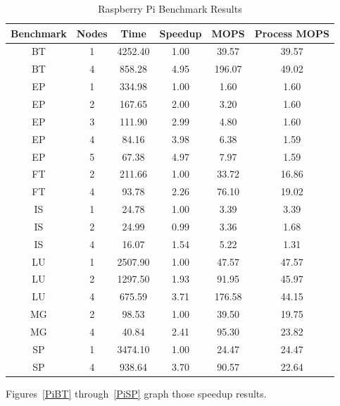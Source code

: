 \documentclass{acm_proc_article-sp}
\begin{document}
\begin{table}[tbp]
\centering
\caption{Raspberry Pi Benchmark Results}
\label{PiTable}
\begin{tabular}{ c | c || c | c | c | c }
	Benchmark & Nodes & Time & Speedup & MOPS & Process MOPS\\ \hline
    BT & 1 & 4252.40 & 1.00  & 39.57 & 39.57 \\
    BT & 4 & 858.28 & 4.95  & 196.07 & 49.02 \\
    EP & 1 & 334.98 & 1.00  & 1.60   & 1.60 \\
    EP & 2 & 167.65 & 2.00  & 3.20   & 1.60 \\
    EP & 3 & 111.90 & 2.99  & 4.80   & 1.60 \\
    EP & 4 & 84.16 & 3.98  & 6.38  & 1.59 \\
    EP & 5 & 67.38 & 4.97  & 7.97  & 1.59 \\
    FT & 2 & 211.66 & 1.00  & 33.72 & 16.86 \\
    FT & 4 & 93.78 & 2.26  & 76.10  & 19.02 \\
    IS & 1 & 24.78 & 1.00  & 3.39  & 3.39 \\
    IS & 2 & 24.99 & 0.99  & 3.36  & 1.68 \\
    IS & 4 & 16.07 & 1.54  & 5.22  & 1.31 \\
    LU & 1 & 2507.90 & 1.00  & 47.57 & 47.57 \\
    LU & 2 & 1297.50 & 1.93  & 91.95 & 45.97 \\
    LU & 4 & 675.59 & 3.71  & 176.58 & 44.15 \\
    MG & 2 & 98.53 & 1.00  & 39.50  & 19.75 \\
    MG & 4 & 40.84 & 2.41  & 95.30  & 23.82 \\
    SP & 1 & 3474.10 & 1.00  & 24.47 & 24.47 \\
    SP & 4 & 938.64 & 3.70  & 90.57 & 22.64 \\
\end{tabular}
\end{table}

Figures~\ref{PiBT} through~\ref{PiSP} graph those speedup results.
\end{document}
